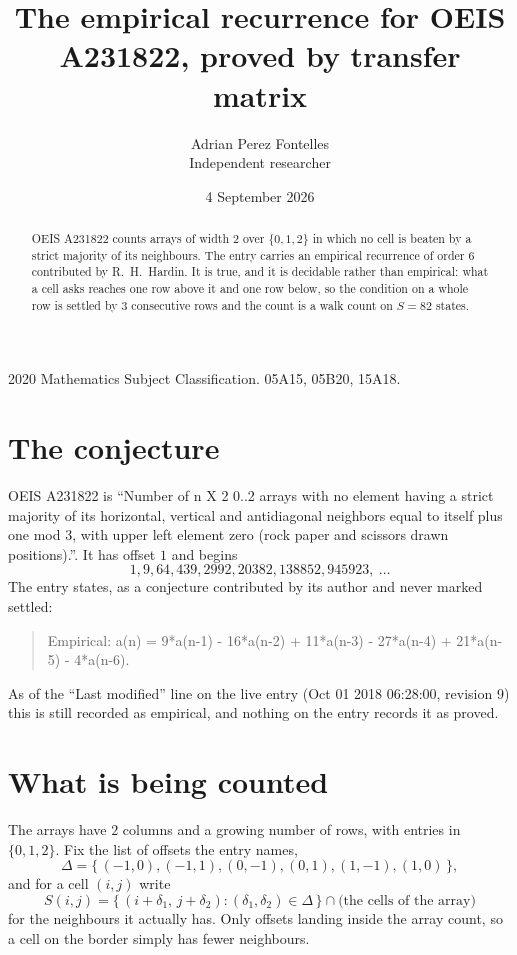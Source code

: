\documentclass[11pt,a4paper]{article}
\title{The empirical recurrence for OEIS A231822, proved by transfer matrix}
\author{Adrian Perez Fontelles\\ \small Independent researcher}
\date{4 September 2026}
\theoremstyle{plain}
\theoremstyle{definition}
\begin{document}
\maketitle

\begin{abstract}
OEIS A231822 counts arrays of width $2$ over $\{0,1,2\}$ in which no cell is beaten by a strict majority of its neighbours. The entry carries an
empirical recurrence of order $6$ contributed by R.~H.~Hardin. It is true, and it is
decidable rather than empirical: what a cell asks reaches one row above
it and one row below, so the condition on a whole row is settled by
$3$ consecutive rows and the count is a walk count on $S=82$ states.
\end{abstract}

\noindent\small 2020 Mathematics Subject Classification. 05A15, 05B20, 15A18.\normalsize

\section{The conjecture}

OEIS A231822 is ``Number of n X 2 0..2 arrays with no element having a strict majority of its horizontal, vertical and antidiagonal neighbors equal to itself plus one mod 3, with upper left element zero (rock paper and scissors drawn positions).''. It has offset $1$ and begins
\[
1, 9, 64, 439, 2992, 20382, 138852, 945923,\ \dots
\]
The entry states, as a conjecture contributed by its author and never marked settled:
\begin{quote}
Empirical: a(n) = 9*a(n-1) - 16*a(n-2) + 11*a(n-3) - 27*a(n-4) + 21*a(n-5) - 4*a(n-6).
\end{quote}
As of the ``Last modified'' line on the live entry (Oct 01 2018 06:28:00, revision 9) this is still
recorded as empirical, and nothing on the entry records it as proved.

\section{What is being counted}

The arrays have $2$ columns and a growing number of rows, with entries in $\{0,1,2\}$. Fix the
list of offsets the entry names,
\[
\Delta=\{\,(-1,0), (-1,1), (0,-1), (0,1), (1,-1), (1,0)\,\},
\]
and for a cell $(i,j)$ write
\[
S(i,j)=\{\,(i+\delta_1,\,j+\delta_2) : (\delta_1,\delta_2)\in\Delta\,\}\cap
\text{(the cells of the array)}
\]
for the neighbours it actually has. Only offsets landing inside the array count, so a cell on
the border simply has fewer neighbours.
\end{document}
